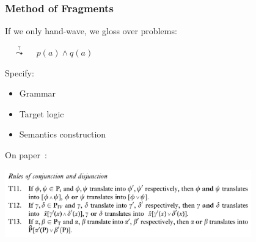 

\begin{frame}
    \frametitle{Method of Fragments}
    If we only hand-wave, we gloss over problems:

    \hspace{2em}
    {$\quad\stackrel{?}{\leadsto}\quad$ \color{logicfont} $p(a)\wedge q(a)$}

    \vspace{1.5em}
    Specify:
    \begin{itemize}
        \item Grammar
        \item Target logic
        \item Semantics construction
    \end{itemize}

    \vspace{1.5em}
    On paper~\cite{Montague:tptoqi73}:

    \vspace{0.3em}\hspace{2em}\includegraphics[trim=0 0 0 80,clip,width=0.8\textwidth]{fig/montague-tptoqioe.png}
\end{frame}

